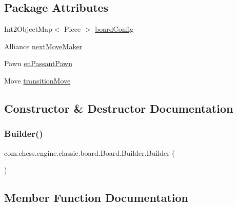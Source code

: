 \subsection*{Package Attributes}
\begin{DoxyCompactItemize}
\item 
Int2\+Object\+Map$<$ Piece $>$ \mbox{\hyperlink{classcom_1_1chess_1_1engine_1_1classic_1_1board_1_1_board_1_1_builder_afbc4d6066ee4bc53d1a55b2658204974}{board\+Config}}
\item 
Alliance \mbox{\hyperlink{classcom_1_1chess_1_1engine_1_1classic_1_1board_1_1_board_1_1_builder_af066f86ebb23734e856e979d38c620bc}{next\+Move\+Maker}}
\item 
Pawn \mbox{\hyperlink{classcom_1_1chess_1_1engine_1_1classic_1_1board_1_1_board_1_1_builder_ad1c27cc760e0a7676fc4c0061ddca3dc}{en\+Passant\+Pawn}}
\item 
Move \mbox{\hyperlink{classcom_1_1chess_1_1engine_1_1classic_1_1board_1_1_board_1_1_builder_aaf84641d4b0678158dc1128dd200a03c}{transition\+Move}}
\end{DoxyCompactItemize}


\subsection{Constructor \& Destructor Documentation}
\mbox{\label{classcom_1_1chess_1_1engine_1_1classic_1_1board_1_1_board_1_1_builder_a08316ed69729303ec6dd3f293543b016}} 
\subsubsection{\texorpdfstring{Builder()}{Builder()}}
{\footnotesize\ttfamily com.\+chess.\+engine.\+classic.\+board.\+Board.\+Builder.\+Builder (\begin{DoxyParamCaption}{ }\end{DoxyParamCaption})}



\subsection{Member Function Documentation}
\mbox{\label{classcom_1_1chess_1_1engine_1_1classic_1_1board_1_1_board_1_1_builder_aeafdcdd0955463d91a701298008fe24d}} 
